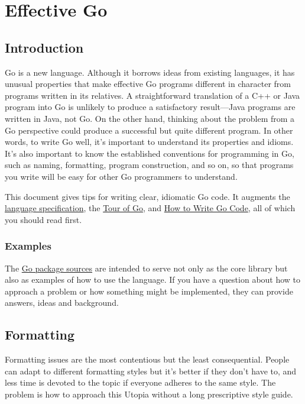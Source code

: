 \cleardoublepage
{}
{}
\chapter*{Effective Go}

\section*{Introduction}

Go is a new language. Although it borrows ideas from existing languages,
it has unusual properties that make effective Go programs different in
character from programs written in its relatives. A straightforward
translation of a C++ or Java program into Go is unlikely to produce a
satisfactory result---Java programs are written in Java, not Go. On the
other hand, thinking about the problem from a Go perspective could
produce a successful but quite different program. In other words, to
write Go well, it's important to understand its properties and idioms.
It's also important to know the established conventions for programming
in Go, such as naming, formatting, program construction, and so on, so
that programs you write will be easy for other Go programmers to
understand.

This document gives tips for writing clear, idiomatic Go code. It
augments the \href{/ref/spec}{language specification}, the
\href{http://tour.golang.org/}{Tour of Go}, and
\href{/doc/code.html}{How to Write Go Code}, all of which you should
read first.

\subsection*{Examples}

The \href{/src/pkg/}{Go package sources} are intended to serve not only
as the core library but also as examples of how to use the language. If
you have a question about how to approach a problem or how something
might be implemented, they can provide answers, ideas and background.

\section*{Formatting}

Formatting issues are the most contentious but the least consequential.
People can adapt to different formatting styles but it's better if they
don't have to, and less time is devoted to the topic if everyone adheres
to the same style. The problem is how to approach this Utopia without a
long prescriptive style guide.

